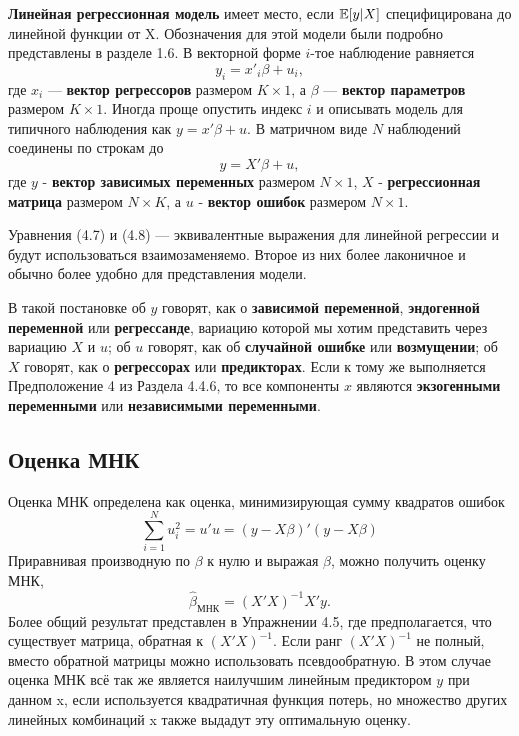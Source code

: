 \textbf{Линейная регрессионная модель} имеет место, если $\mathbb{E}{[y|X]}$ специфицирована до линейной функции от X. Обозначения для этой модели были подробно представлены в разделе 1.6. В векторной форме $i$-тое наблюдение равняется
\begin{equation}
y_i = x'_i \beta + u_i ,
\end{equation}
где $x_i$ --- \textbf{вектор регрессоров} размером $K\times 1$, а $\beta$ --- \textbf{вектор параметров} размером $K\times 1$. Иногда проще опустить индекс $i$ и описывать модель для типичного наблюдения как $y = x' \beta + u$. В матричном виде $N$ наблюдений соединены по строкам до  
\begin{equation}
y = X' \beta + u,
\end{equation}
где $y$ - \textbf{вектор зависимых переменных} размером  $N\times 1$, $X$ - \textbf{регрессионная матрица} размером $N\times K$, а $u$ - \textbf{вектор ошибок} размером  $N\times 1$. 

Уравнения (4.7) и (4.8) --- эквивалентные выражения для линейной регрессии и будут использоваться взаимозаменяемо. Второе из них более лаконичное и обычно более удобно для представления модели.

В такой постановке об $y$ говорят, как о \textbf{зависимой переменной}, \textbf{эндогенной переменной} или \textbf{регрессанде}, вариацию которой мы хотим представить через вариацию $X$ и $u$; об $u$ говорят, как об \textbf{случайной ошибке} или \textbf{возмущении}; об $X$ говорят, как о \textbf{регрессорах} или \textbf{предикторах}. Если к тому же выполняется Предположение 4 из Раздела 4.4.6, то все компоненты $x$ являются \textbf{экзогенными переменными} или \textbf{независимыми переменными}.

\subsection{Оценка МНК}

Оценка МНК определена как оценка, минимизирующая сумму квадратов ошибок
\begin{equation}
\sum_{i=1}^N u_i^2 = u'u = (y-X\beta)'(y-X\beta)
\end{equation}
Приравнивая производную по $\beta$ к нулю и выражая $\beta$, можно получить оценку МНК,
\begin{equation}
\hat{\beta}_{\text{МНК}} = (X'X)^{-1}X'y.
\end{equation}
Более общий результат представлен в Упражнении 4.5, где предполагается, что существует матрица, обратная к $(X'X)^{-1}$. Если ранг $(X'X)^{-1}$ не полный, вместо обратной матрицы можно использовать псевдообратную. В этом случае оценка МНК всё так же является наилучшим линейным предиктором $y$ при данном x, если используется квадратичная функция потерь, но множество других линейных комбинаций x также выдадут эту оптимальную оценку. 


